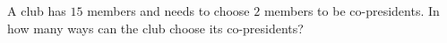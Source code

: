 A club has $15$ members and needs to choose $2$ members to be co-presidents. In how many ways can the club choose its co-presidents?
